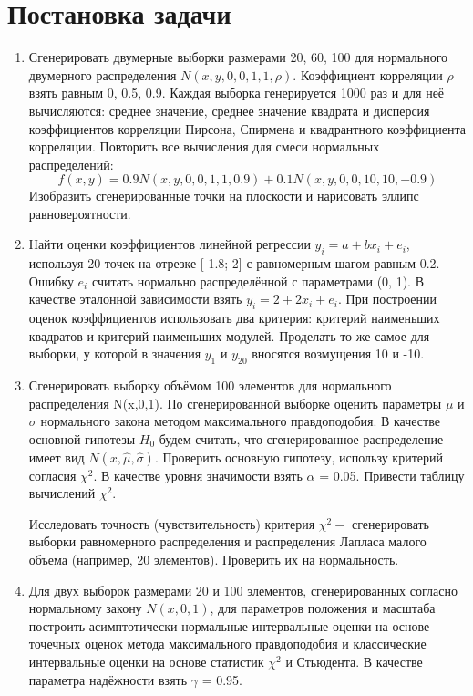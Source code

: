 \documentclass[a4paper]{article}
\begin{document}
\section {Постановка задачи}
\noindent \begin{enumerate}
\item Сгенерировать двумерные выборки размерами 20, 60, 100 для нормального двумерного распределения $N(x,y,0,0,1,1,\rho)$. Коэффициент корреляции $\rho$ взять равным 0, 0.5, 0.9. Каждая выборка генерируется 1000 раз и для неё вычисляются: среднее значение, среднее значение квадрата и дисперсия коэффициентов корреляции Пирсона, Спирмена и квадрантного коэффициента корреляции. Повторить все вычисления для смеси нормальных распределений:
\begin{equation}
	f(x,y) = 0.9N(x,y,0,0,1,1,0.9) + 0.1N(x,y,0,0,10,10,-0.9)
\end{equation}
\noindent Изобразить сгенерированные точки на плоскости и нарисовать эллипс равновероятности.
\item \noindent Найти оценки коэффициентов линейной регрессии $y_{i} = a + bx_{i} + e_{i}$, используя 20 точек на отрезке [-1.8; 2] с равномерным шагом равным 0.2. Ошибку $e_{i}$ считать нормально распределённой с параметрами (0, 1). В качестве эталонной зависимости взять $y_{i} = 2 + 2x_{i} + e_{i}$. При построении оценок коэффициентов использовать два критерия: критерий наименьших квадратов и критерий наименьших модулей. Проделать то же самое для выборки, у которой в значения $y_{1}$ и $y_{20}$ вносятся возмущения 10 и -10. 
\item \noindent Сгенерировать выборку объёмом 100 элементов для нормального распределения N(x,0,1). По сгенерированной выборке оценить параметры $\mu$ и $\sigma$ нормального закона методом максимального правдоподобия. В качестве основной гипотезы $H_{0}$ будем считать, что сгенерированное распределение имеет вид $N(x,\hat{\mu}, \hat{\sigma})$. Проверить основную гипотезу, использу критерий согласия $\chi^{2}$. В качестве уровня значимости взять $\alpha$ = 0.05. Привести таблицу вычислений $\chi^{2}$. 

\noindent Исследовать точность (чувствительность) критерия $\chi^{2} - $ сгенерировать выборки равномерного распределения и распределения Лапласа малого объема (например, 20 элементов). Проверить их на нормальность.
\item \noindent Для двух выборок размерами 20 и 100 элементов, сгенерированных согласно нормальному закону $N(x,0,1)$, для параметров положения и масштаба построить асимптотически нормальные интервальные оценки на основе точечных оценок метода максимального правдоподобия и классические интервальные оценки на основе статистик $\chi^{2}$ и Стьюдента. В качестве параметра надёжности взять $\gamma$ = 0.95.

\end{enumerate}
\end{document}
